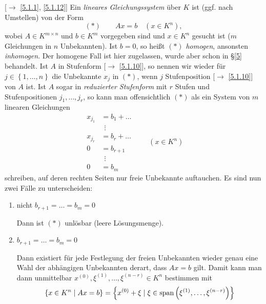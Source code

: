 \documentclass[../../main.tex]{subfiles}
\begin{document}
\begin{sprbem}\label{7.3.1}
[$\to$ \ref{5.1.1}, \ref{5.1.12}] Ein \emph{lineares Gleichungssystem} über $K$ ist (ggf. nach Umstellen) von der Form \[(*)\qquad Ax = b\quad (x\in K^n),\] wobei $A\in K^{m\times n}$ und $b\in K^m$ vorgegeben sind und $x\in K^n$ gesucht ist ($m$ Gleichungen in $n$ Unbekannten). Ist $b = 0$, so heißt $(*)$ \emph{homogen}, ansonsten \emph{inhomogen}. Der homogene Fall ist hier zugelassen, wurde aber schon in §\ref{5} behandelt. Ist $A$ in Stufenform [$\to$ \ref{5.1.10}], so nennen wir wieder für $j\in\left\{1,\ldots,n\right\}$ die Unbekannte $x_j$  in $(*)$, wenn $j$  Stufenposition [$\to$ \ref{5.1.10}] von $A$ ist. Ist $A$ sogar in \emph{reduzierter Stufenform} mit $r$ Stufen und Stufenpositionen $j_1,\ldots,j_r$, so kann man offensichtlich $(*)$ als ein System von $m$ linearen Gleichungen
\[
\begin{split}
x_{j_1} & = b_1 + \ldots\\
& \ ~\vdots\\
x_{j_r} & =  b_r + \ldots\\
 0 & =  b_{r+1}\\
 & \ ~\vdots\\
 0 & =  b_m
\end{split}
\qquad(x\in K^n)
\]
schreiben, auf deren rechten Seiten nur freie Unbekannte auftauchen. Es sind nun zwei Fälle zu unterscheiden:
\begin{enumerate}[{Fall} 1:]
\item nicht $b_{r+1} = \ldots = b_m = 0$

Dann ist $(*)$ unlösbar (leere Lösungsmenge).
\item $b_{r+1} = \ldots = b_m = 0$

Dann existiert für jede Festlegung der freien Unbekannten wieder genau eine Wahl der abhängigen Unbekannten derart, dass $Ax = b$ gilt. Damit kann man dann unmittelbar $x^{(0)}, \xi^{(1)},\ldots, \xi^{(n-r)}\in K^n$ bestimmen mit
$$\left\{x\in K^n\mid Ax = b\right\} = \left\{x^{(0)}+\xi\mid \xi\in\operatorname{span}\left(\xi^{(1)},\ldots,\xi^{(n-r)}\right)\right\}$$
\end{enumerate}
\end{sprbem}
\end{document}
